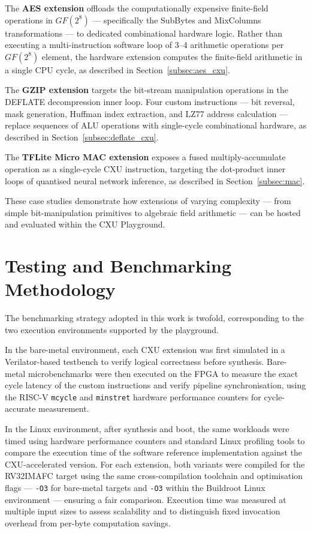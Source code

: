 The \textbf{AES extension} offloads the computationally expensive finite-field
operations in $GF(2^8)$ --- specifically the SubBytes and MixColumns transformations ---
to dedicated combinational hardware logic.
Rather than executing a multi-instruction software loop of 3--4 arithmetic operations
per $GF(2^8)$ element, the hardware extension computes the finite-field arithmetic in a
single CPU cycle, as described in Section~\ref{subsec:aes_cxu}.

The \textbf{GZIP extension} targets the bit-stream manipulation operations in the
DEFLATE decompression inner loop.
Four custom instructions --- bit reversal, mask generation, Huffman index extraction,
and LZ77 address calculation --- replace sequences of ALU operations with single-cycle
combinational hardware, as described in Section~\ref{subsec:deflate_cxu}.

The \textbf{TFLite Micro MAC extension} exposes a fused multiply-accumulate operation
as a single-cycle CXU instruction, targeting the dot-product inner loops of
quantised neural network inference, as described in Section~\ref{subsec:mac}.

These case studies demonstrate how extensions of varying complexity --- from simple
bit-manipulation primitives to algebraic field arithmetic --- can be hosted and evaluated
within the CXU Playground.

\section{Testing and Benchmarking Methodology}
\label{sec:testing}

The benchmarking strategy adopted in this work is twofold, corresponding to the two
execution environments supported by the playground.

In the bare-metal environment, each CXU extension was first simulated in a
Verilator-based testbench to verify logical correctness before synthesis.
Bare-metal microbenchmarks were then executed on the FPGA to measure the exact cycle
latency of the custom instructions and verify pipeline synchronisation, using the
RISC-V \texttt{mcycle} and \texttt{minstret} hardware performance counters for
cycle-accurate measurement.

In the Linux environment, after synthesis and boot, the same workloads were timed using
hardware performance counters and standard Linux profiling tools to compare the
execution time of the software reference implementation against the CXU-accelerated
version.
For each extension, both variants were compiled for the RV32IMAFC target using the same
cross-compilation toolchain and optimisation flags --- \texttt{-O3} for bare-metal
targets and \texttt{-O3} within the Buildroot Linux environment --- ensuring a fair comparison.
Execution time was measured at multiple input sizes to assess scalability and to
distinguish fixed invocation overhead from per-byte computation savings.

